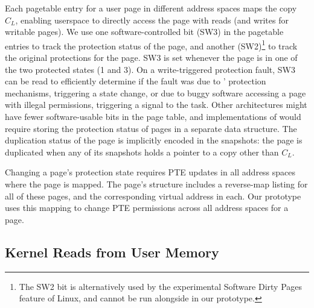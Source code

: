 \documentclass[letterpaper,twocolumn,10pt]{article}
\begin{document}
Each pagetable entry for a user page in different address spaces
maps the copy $C_L$, enabling userspace to directly access the page
with reads (and writes for writable pages).
We use one software-controlled bit (SW3) in the pagetable entries
to track the protection status of the page, and another
(SW2)\footnote{The SW2 bit is alternatively used by the experimental Software Dirty Pages feature of
Linux, and cannot be run alongside \midas in our prototype.}
to track the original protections for the page.
SW3 is set whenever the page is in one of the two protected
states (1 and 3).
On a write-triggered protection fault, SW3 can be read to
efficiently determine if the fault was due to \midas' protection
mechanisms, triggering a state change, or due to buggy software
accessing a page with illegal permissions, triggering a signal to
the task.
Other architectures might have fewer software-usable
bits in the page table, and implementations of \midas would
require storing the protection status of pages in a separate data structure.
The duplication status of the page is implicitly encoded in the
snapshots: the page is duplicated when any of its snapshots
holds a pointer to a copy other than $C_L$.

Changing a page's protection state requires PTE updates
in all address spaces where the page is mapped.
The page's  structure includes a reverse-map
listing for all of these pages, and the corresponding virtual
address in each.
Our prototype uses this mapping to change PTE permissions across
all address spaces for a page.


\subsection{Kernel Reads from User Memory}
\end{document}
